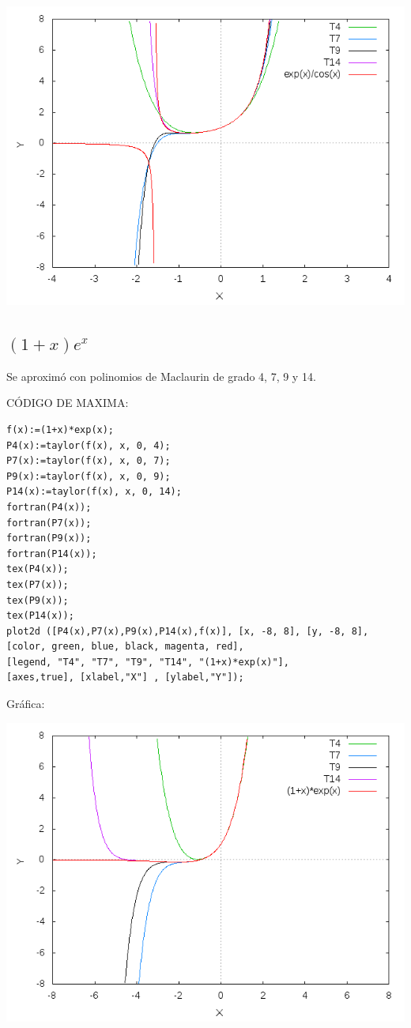 \documentclass[notitlepage,12pt]{article}
\begin{document}
\includegraphics[scale=0.5]{exp(x)_cos(x)_ptaylor}

\subsection{$(1+x)e^x$}
Se aproxim\'o con polinomios de Maclaurin de grado 4, 7, 9 y 14.

C\'ODIGO DE MAXIMA:
\begin{verbatim}
f(x):=(1+x)*exp(x);
P4(x):=taylor(f(x), x, 0, 4);
P7(x):=taylor(f(x), x, 0, 7);
P9(x):=taylor(f(x), x, 0, 9);
P14(x):=taylor(f(x), x, 0, 14);
fortran(P4(x));
fortran(P7(x));
fortran(P9(x));
fortran(P14(x));
tex(P4(x));
tex(P7(x));
tex(P9(x));
tex(P14(x));
plot2d ([P4(x),P7(x),P9(x),P14(x),f(x)], [x, -8, 8], [y, -8, 8],
[color, green, blue, black, magenta, red],
[legend, "T4", "T7", "T9", "T14", "(1+x)*exp(x)"],
[axes,true], [xlabel,"X"] , [ylabel,"Y"]);
\end{verbatim}
Gr\'afica:


\includegraphics[scale=0.5]{(1+x)(exp(x))}
\end{document}
